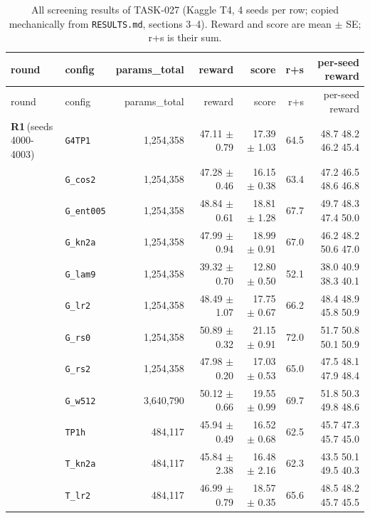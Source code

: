 \begin{longtable}{@{}llrrrrr@{}}
\caption{All screening results of TASK-027 (Kaggle T4, 4 seeds per row; copied mechanically from \texttt{RESULTS.md}, sections 3--4). Reward and score are mean $\pm$ SE; r+s is their sum.}\label{tab:screens}\\
\toprule round & config & params\_total & reward & score & r+s & per-seed reward\\\midrule\endfirsthead
\toprule round & config & params\_total & reward & score & r+s & per-seed reward\\\midrule\endhead
\textbf{R1}\,{\scriptsize(seeds 4000-4003)} & \texttt{\scriptsize G4TP1} & 1,254,358 & 47.11 $\pm$ 0.79 & 17.39 $\pm$ 1.03 & 64.5 & {\scriptsize 48.7 48.2 46.2 45.4}\\
 & \texttt{\scriptsize G\_cos2} & 1,254,358 & 47.28 $\pm$ 0.46 & 16.15 $\pm$ 0.38 & 63.4 & {\scriptsize 47.2 46.5 48.6 46.8}\\
 & \texttt{\scriptsize G\_ent005} & 1,254,358 & 48.84 $\pm$ 0.61 & 18.81 $\pm$ 1.28 & 67.7 & {\scriptsize 49.7 48.3 47.4 50.0}\\
 & \texttt{\scriptsize G\_kn2a} & 1,254,358 & 47.99 $\pm$ 0.94 & 18.99 $\pm$ 0.91 & 67.0 & {\scriptsize 46.2 48.2 50.6 47.0}\\
 & \texttt{\scriptsize G\_lam9} & 1,254,358 & 39.32 $\pm$ 0.70 & 12.80 $\pm$ 0.50 & 52.1 & {\scriptsize 38.0 40.9 38.3 40.1}\\
 & \texttt{\scriptsize G\_lr2} & 1,254,358 & 48.49 $\pm$ 1.07 & 17.75 $\pm$ 0.67 & 66.2 & {\scriptsize 48.4 48.9 45.8 50.9}\\
 & \texttt{\scriptsize G\_rs0} & 1,254,358 & 50.89 $\pm$ 0.32 & 21.15 $\pm$ 0.91 & 72.0 & {\scriptsize 51.7 50.8 50.1 50.9}\\
 & \texttt{\scriptsize G\_rs2} & 1,254,358 & 47.98 $\pm$ 0.20 & 17.03 $\pm$ 0.53 & 65.0 & {\scriptsize 47.5 48.1 47.9 48.4}\\
 & \texttt{\scriptsize G\_w512} & 3,640,790 & 50.12 $\pm$ 0.66 & 19.55 $\pm$ 0.99 & 69.7 & {\scriptsize 51.8 50.3 49.8 48.6}\\
 & \texttt{\scriptsize TP1h} & 484,117 & 45.94 $\pm$ 0.49 & 16.52 $\pm$ 0.68 & 62.5 & {\scriptsize 45.7 47.3 45.7 45.0}\\
 & \texttt{\scriptsize T\_kn2a} & 484,117 & 45.84 $\pm$ 2.38 & 16.48 $\pm$ 2.16 & 62.3 & {\scriptsize 43.5 50.1 49.5 40.3}\\
 & \texttt{\scriptsize T\_lr2} & 484,117 & 46.99 $\pm$ 0.79 & 18.57 $\pm$ 0.35 & 65.6 & {\scriptsize 48.5 48.2 45.7 45.5}\\

\end{longtable}
